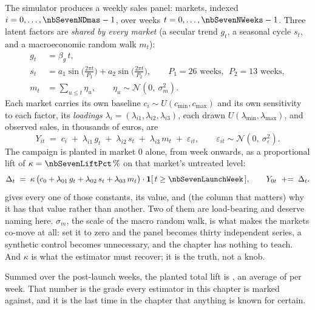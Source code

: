 The simulator produces a weekly sales panel: \nbSevenNDmas{} markets, indexed
$i = 0, \dots, \nbSevenNDmas-1$, over \nbSevenNWeeks{} weeks $t = 0, \dots, \nbSevenNWeeks-1$.
Three latent factors are \emph{shared by every market} (a secular trend $g_t$, a seasonal
cycle $s_t$, and a macroeconomic random walk $m_t$):
%
\begin{align}
  g_t &= \beta_g\,t, \label{eq:sc:trend}\\
  s_t &= a_1\sin\!\Big(\tfrac{2\pi t}{P_1}\Big) + a_2\sin\!\Big(\tfrac{2\pi t}{P_2}\Big),
        \qquad P_1 = 26 \text{ weeks},\ \ P_2 = 13 \text{ weeks},
        \label{eq:sc:season}\\
  m_t &= \sum_{u \le t} \eta_u, \qquad \eta_u \sim \mathcal N\!\left(0,\ \sigma_m^{2}\right).
        \label{eq:sc:macro}
\end{align}
%
Each market carries its own baseline $c_i \sim U(c_{\min}, c_{\max})$ and its own sensitivity to
each factor, its \emph{loadings} $\lambda_i = (\lambda_{i1}, \lambda_{i2}, \lambda_{i3})$, each
drawn $U(\lambda_{\min}, \lambda_{\max})$, and observed sales, in thousands of euros, are
%
\begin{equation}
  Y_{it} \;=\; c_i \;+\; \lambda_{i1}\,g_t \;+\; \lambda_{i2}\,s_t \;+\; \lambda_{i3}\,m_t
           \;+\; \varepsilon_{it},
  \qquad \varepsilon_{it} \sim \mathcal N\!\left(0,\ \sigma_\varepsilon^{2}\right).
  \label{eq:sc:dgp}
\end{equation}
%
The campaign is planted in market $0$ alone, from week \nbSevenLaunchWeek{} onwards, as a
proportional lift of $\kappa = \pc{\nbSevenLiftPct}$ on that market's untreated level:
%
\begin{equation}
  \Delta_t \;=\; \kappa \,\big(c_0 + \lambda_{01}\,g_t + \lambda_{02}\,s_t + \lambda_{03}\,m_t\big)
  \cdot \mathbf 1[\,t \ge \nbSevenLaunchWeek\,],
  \qquad Y_{0t} \;\mathrel{+}=\; \Delta_t .
  \label{eq:sc:lift}
\end{equation}
%
 gives every one of those constants, its value, and (the column that
matters) why it has that value rather than another. Two of them are load-bearing and deserve
naming here. $\sigma_m$, the scale of the macro random walk, is what makes the markets co-move at
all: set it to zero and the panel becomes thirty independent series, a synthetic control becomes
unnecessary, and the chapter has nothing to teach. And $\kappa$ is what the estimator must
recover; it is the truth, not a knob.


%
Summed over the \nbSevenNPost{} post-launch weeks, the planted total lift is
\keur{\nbSevenTrueTotal}, an average of \keur{\nbSevenTrueAvg} per week. That number is the
grade every estimator in this chapter is marked against, and it is the last time in the chapter
that anything is known for certain.

